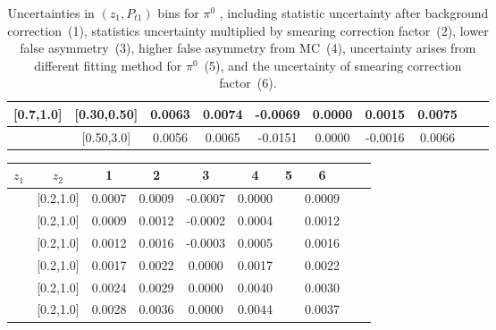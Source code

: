 \begin{table}[H]
\begin{tabular}{|c| c| c| c| c| c| c| c| c| c|}
[0.7,1.0]	&	[0.30,0.50]	&	0.0063	&	0.0074	&	-0.0069	&	0.0000	&	0.0015	&	0.0075	\\ \hline
[0.7,1.0]	&	[0.50,3.0]	&	0.0056	&	0.0065	&	-0.0151	&	0.0000	&	-0.0016	&	0.0066	\\ \hline
\end{tabular}
\caption{Uncertainties in $(z_1,P_{t1})$ bins for $\pi^0$ , including statistic uncertainty after background correction~(1), statistics uncertainty multiplied by smearing correction factor~(2), lower false asymmetry~(3), higher false asymmetry from MC~(4), uncertainty arises from different fitting method for $\pi^0$~(5), and the uncertainty of smearing correction factor~(6).}
\label{tab:pi0foretaerrors_zpt}
\end{table}

\begin{table}[H]\scriptsize
\centering
\begin{tabular}{|c| c| c| c| c| c| c| c| c| c|}
\hline
$z_1$ & $z_2$ & 1 & 2 & 3 & 4& 5& 6 \\ \hline
[0.2,0.3]	&	[0.2,1.0]	&	0.0007	&	0.0009	&	-0.0007	&	0.0000	&		&	0.0009	\\ \hline
[0.3,0.4]	&	[0.2,1.0]	&	0.0009	&	0.0012	&	-0.0002	&	0.0004	&		&	0.0012	\\ \hline
[0.4,0.5]	&	[0.2,1.0]	&	0.0012	&	0.0016	&	-0.0003	&	0.0005	&		&	0.0016	\\ \hline
[0.5,0.6]	&	[0.2,1.0]	&	0.0017	&	0.0022	&	0.0000	&	0.0017	&		&	0.0022	\\ \hline
[0.6,0.7]	&	[0.2,1.0]	&	0.0024	&	0.0029	&	0.0000	&	0.0040	&		&	0.0030	\\ \hline
[0.7,1.0]	&	[0.2,1.0]	&	0.0028	&	0.0036	&	0.0000	&	0.0044	&		&	0.0037	\\ \hline
															

\end{tabular}
\end{table}
